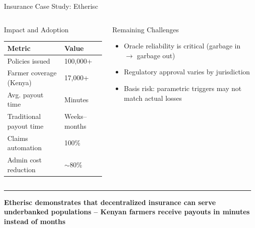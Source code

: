 \documentclass[8pt,aspectratio=169]{beamer}
\newcommand{\bottomnote}[1]{\vfill\vspace{-2mm}\textcolor{mllavender2}{\rule{\textwidth}{0.4pt}}\vspace{1mm}\footnotesize\textbf{#1}}
\begin{document}
\begin{frame}{Insurance Case Study: Etherisc}
\begin{columns}[T]
\begin{block}{Impact and Adoption}
\footnotesize
\begin{tabular}{l l}
\toprule
\textbf{Metric} & \textbf{Value} \\
\midrule
\rowcolor{mllavender4}
Policies issued & 100,000+ \\
Farmer coverage (Kenya) & 17,000+ \\
\rowcolor{mllavender4}
Avg. payout time & Minutes \\
Traditional payout time & Weeks--months \\
\rowcolor{mllavender4}
Claims automation & 100\% \\
Admin cost reduction & $\sim$80\% \\
\bottomrule
\end{tabular}
\end{block}
\vspace{2mm}
\begin{alertblock}{Remaining Challenges}
\footnotesize
\begin{itemize}
  \item Oracle reliability is critical (garbage in $\rightarrow$ garbage out)
  \item Regulatory approval varies by jurisdiction
  \item Basis risk: parametric triggers may not match actual losses
\end{itemize}
\end{alertblock}
\end{columns}
\bottomnote{Etherisc demonstrates that decentralized insurance can serve underbanked populations -- Kenyan farmers receive payouts in minutes instead of months}
\end{frame}
\end{document}
